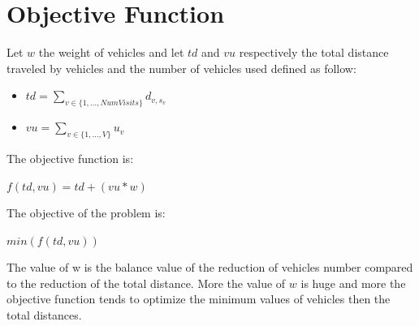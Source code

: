 \section{Objective Function}
Let \begin{math}w\end{math} the weight of vehicles and let \begin{math} td\end{math} and \begin{math}vu\end{math} respectively the total distance traveled by vehicles and the number of vehicles used defined as follow: 
\begin{itemize}
    \item \begin{math}td = \sum_{v \in \{1,...,NumVisits\}}d_{v, s_{v}}\end{math}
    \item \begin{math}vu = \sum_{v \in \{1,...,V\}}u_{v}\end{math}
\end{itemize}
The objective function is:
\begin{center}
    \begin{math}f(td,vu) = td + (vu * w)\end{math}
\end{center}
The objective of the problem is:
\begin{center}
    \begin{math}min(f(td,vu))\end{math}
\end{center}
The value of w is the balance value of the reduction of vehicles number compared to the reduction of the total distance. More the value of \begin{math}w\end{math} is huge and more the objective function tends to optimize the minimum values of vehicles then the total distances.


